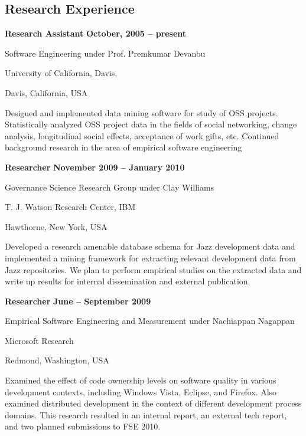 \documentclass[margin,line,article]{res}
\newenvironment{list1}{
  \begin{list}{}{%
      \setlength{\itemsep}{0in}
      \setlength{\parsep}{0in} \setlength{\parskip}{0in}
      \setlength{\topsep}{0in} \setlength{\partopsep}{0in} 
      \setlength{\leftmargin}{0.17in}}}{\end{list}}
\begin{document}
\begin{resume}
\section{Research Experience}
\textbf{Research Assistant} \hfill \textbf{October, 2005 -- present}\\
\vspace{-10pt}
\begin{list1}
\item Software Engineering under Prof. Premkumar Devanbu
\item University of California, Davis,
\item Davis, California, USA
\vspace{6pt}
\item Designed and implemented data mining software for study of OSS projects. Statistically 
analyzed OSS project data in the fields of social networking, change analysis, 
longitudinal social effects, acceptance of work gifts, etc. Continued background research in the 
area of empirical software engineering 
\end{list1}

\textbf{Researcher} \hfill \textbf{November 2009 -- January 2010}\\
\vspace{-10pt}
\begin{list1}
\item Governance Science Research Group under Clay Williams
\item T. J. Watson Research Center, IBM
\item Hawthorne, New York, USA
\vspace{6pt}
\item Developed a research amenable database schema for Jazz development
    data and implemented a mining framework for extracting relevant development
    data from Jazz repositories.  We plan to perform empirical studies on the
    extracted data and write up results for internal dissemination and external
    publication.
\end{list1}


\textbf{Researcher} \hfill \textbf{June -- September 2009}\\
\vspace{-10pt}
\begin{list1}
\item Empirical Software Engineering and Measurement under Nachiappan Nagappan
\item Microsoft Research
\item Redmond, Washington, USA
\vspace{6pt}
\item Examined the effect of code ownership levels on software quality in various
	development contexts, including Windows Vista, Eclipse, and Firefox.  Also
	examined distributed development in the context of different development
	process domains.  This research resulted in an internal report, an external
	tech report, and two planned submissions to FSE 2010.
\end{list1}


\end{resume}
\end{document}
